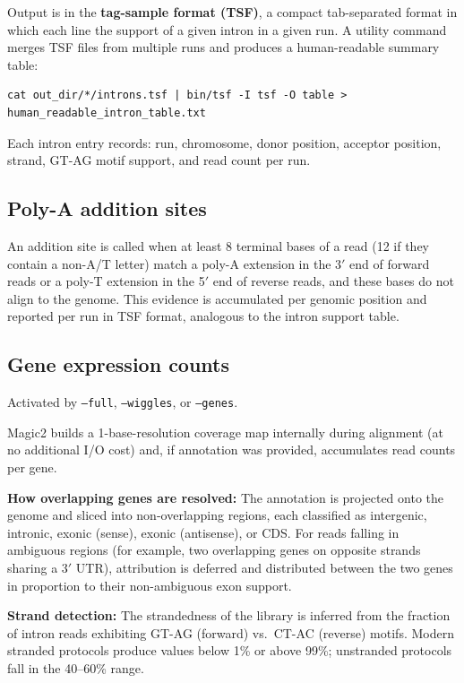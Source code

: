 \documentclass[11pt]{article}
\newcommand{\code}[1]{\texttt{#1}}
\begin{document}
Output is in the \textbf{tag-sample format (TSF)}, a compact
tab-separated format in which each line the support of a given intron in a given run.
A utility command merges TSF files from multiple runs and produces a
human-readable summary table:
\begin{lstlisting}
cat out_dir/*/introns.tsf | bin/tsf -I tsf -O table > human_readable_intron_table.txt
\end{lstlisting}

Each intron entry records: run, chromosome, donor position, acceptor position,
strand, GT-AG motif support, and read count per run.

\subsection{Poly-A addition sites}

An addition site is called when at least 8 terminal bases of a read
(12 if they contain a non-A/T letter) match a poly-A extension in the
3$'$ end of forward reads or a poly-T extension in the 5$'$ end of
reverse reads, and these bases do not align to the genome.  This
evidence is accumulated per genomic position and reported per run in
TSF format, analogous to the intron support table.

\subsection{Gene expression counts}\label{sec:genecounts}

Activated by \code{--full}, \code{--wiggles}, or \code{--genes}.

Magic2 builds a 1-base-resolution coverage map internally during
alignment (at no additional I/O cost) and, if annotation was provided,
accumulates read counts per gene.

\textbf{How overlapping genes are resolved:}
The annotation is projected onto the genome and sliced into
non-overlapping regions, each classified as intergenic, intronic,
exonic (sense), exonic (antisense), or CDS.  For reads falling in
ambiguous regions (for example, two overlapping genes on opposite
strands sharing a 3$'$ UTR), attribution is deferred and distributed
between the two genes in proportion to their non-ambiguous exon support.

\textbf{Strand detection:}
The strandedness of the library is inferred from the fraction of intron
reads exhibiting GT-AG (forward) vs.\ CT-AC (reverse) motifs.  Modern
stranded protocols produce values below 1\% or above 99\%; unstranded
protocols fall in the 40--60\% range.
\end{document}
